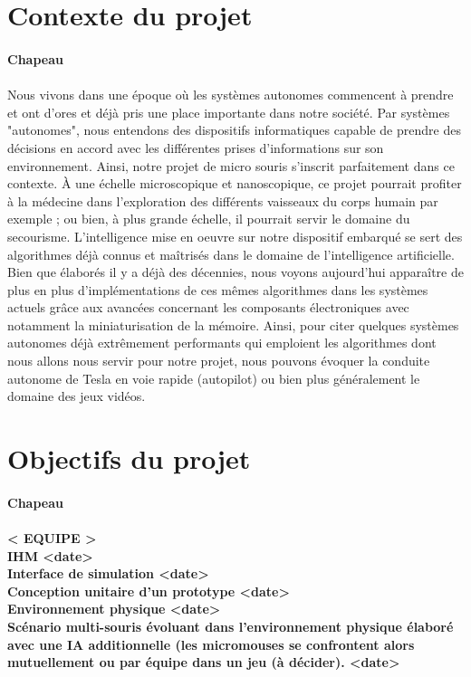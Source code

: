 \section{Contexte du projet}
\label{sec:introduction_contexte_du_projet}

\paragraph{Chapeau}{}
\paragraph{}
{Nous vivons dans une époque où les systèmes autonomes commencent à prendre et ont d'ores et déjà pris une place importante dans notre société. Par systèmes "autonomes", nous entendons des dispositifs informatiques capable de prendre des décisions en accord avec les différentes prises d'informations sur son environnement. Ainsi, notre projet de micro souris s'inscrit parfaitement dans ce contexte.  À une échelle microscopique et nanoscopique, ce projet pourrait profiter à la médecine dans l'exploration des différents vaisseaux du corps humain par exemple ; ou bien, à plus grande échelle, il pourrait servir le domaine du secourisme. L'intelligence mise en oeuvre sur notre dispositif embarqué se sert des algorithmes déjà connus et maîtrisés dans le domaine de l'intelligence artificielle. Bien que élaborés il y a déjà des décennies, nous voyons aujourd'hui apparaître de plus en plus d'implémentations de ces mêmes algorithmes dans les systèmes actuels grâce aux avancées concernant les composants électroniques avec notamment la miniaturisation de la mémoire. Ainsi, pour citer quelques systèmes autonomes déjà extrêmement performants qui emploient les algorithmes dont nous allons nous servir pour notre projet, nous pouvons évoquer la conduite autonome de Tesla en voie rapide (autopilot) ou bien plus généralement le domaine des jeux vidéos.
\\< À DEVELOPPER >}

\section{Objectifs du projet}
\label{sec:introduction_objectifs_du_projet}

\paragraph{Chapeau}
\paragraph{
< EQUIPE >
\\ IHM <date>
\\ Interface de simulation <date>
\\ Conception unitaire d'un prototype <date>
\\ Environnement physique <date>
\\ Scénario multi-souris évoluant dans l'environnement physique élaboré avec une IA additionnelle (les micromouses se confrontent alors mutuellement ou par équipe dans un jeu (à décider). <date>
}

